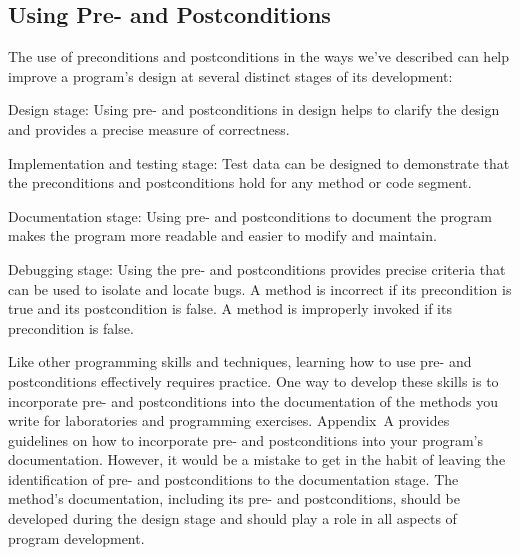 \subsection*{Using \mbox{Pre-} and Postconditions}
\noindent The use of preconditions and postconditions in the ways we've
described can help improve a program's design at several distinct
stages of its \mbox{development:}

\begin{BL}
\item  Design stage: Using pre- and postconditions in design helps
to clarify the design and provides a precise measure of correctness.

\item  Implementation and testing stage: Test data can be designed
to demonstrate that the preconditions and postconditions hold for
any method or code segment.

\item  Documentation stage: Using pre- and postconditions to document
the program makes the program more readable and easier to modify and
maintain.

\item  Debugging stage: Using the pre- and postconditions provides
precise criteria that can be used to isolate and locate bugs. A
method is incorrect if its precondition is true and its postcondition
is false. A method is improperly invoked if its precondition is false.
\end{BL}

\noindent Like other programming skills and techniques, learning how
to use pre- and postconditions effectively requires practice. One way
to develop these skills is to incorporate pre- and postconditions into
the documentation of the methods you write for laboratories and
programming exercises.  Appendix~A provides guidelines on how to
incorporate pre- and postconditions into your program's documentation.
However, it would be a mistake to get in the habit of leaving the
identification of pre- and postconditions to the documentation
stage. The method's documentation, including its pre- and
postconditions, should be developed during the design stage and
should play a role in all aspects of program development.


